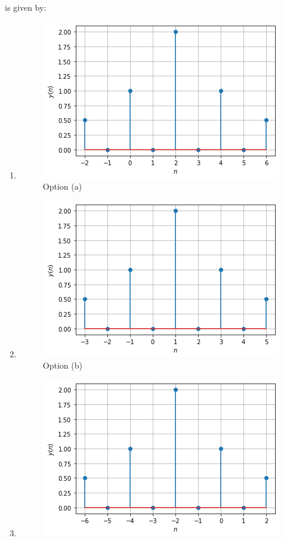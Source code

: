 \begin{enumerate}[label=\arabic*.,ref=\theenumi]
is given by:
\begin{enumerate}
\item 
\begin{figure}[!ht]
    \centering
    \includegraphics[width=0.8\columnwidth] {solutions/ec/2005/85/Figures/Gate_Assignment_3_Fig_2.png}
    \caption{Option (a)}
    \label{ec/2005/85/Option (a)}
\end{figure}
\item 
\begin{figure}[!ht]
    \centering
    \includegraphics[width=0.8\columnwidth] {solutions/ec/2005/85/Figures/Gate_Assignment_3_Fig_3.png}
    \caption{Option (b)}
    \label{ec/2005/85/Option (b)}
\end{figure}
\item 
\begin{figure}[!ht]
    \centering
    \includegraphics[width=0.8\columnwidth] {solutions/ec/2005/85/Figures/Gate_Assignment_3_Fig_4.png}

\end{figure}
\end{enumerate}
\end{enumerate}
